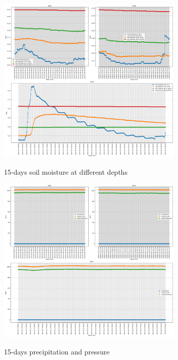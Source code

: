 \begin{figure}[h]
	\centering
	\caption{15-days soil moisture at different depths }
	\includegraphics[width=0.8\textwidth]{graphs/weather_variables/15_soil_moisture_0_to_7cm_soil_moisture_7_to_28cm_soil_moisture_28_to_100cm.png}
	\label{fig:soil_moist}
\end{figure}

\begin{figure}[h]
	\centering
	\caption{15-days precipitation and pressure }
	\includegraphics[width=0.8\textwidth]{graphs/weather_variables/15_precipitation_pressure_msl_surface_pressure.png}
	\label{fig:precipitation_pressure}
\end{figure}

